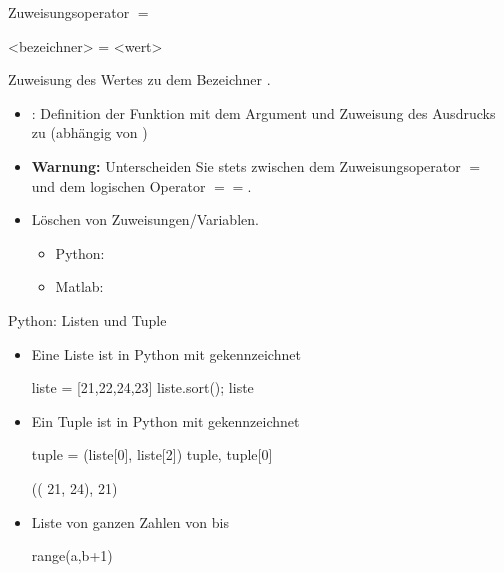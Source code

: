 \documentclass[hyperref={xetex}]{beamer}
\begin{document}
\begin{frame}[fragile]{Zuweisungsoperator $=$}
    \begin{pyin}
<bezeichner> = <wert>
    \end{pyin}   
Zuweisung des Wertes  zu dem Bezeichner .
\begin{itemize}
\item {\color{blue} }: Definition der Funktion  mit dem Argument  und Zuweisung des Ausdrucks  zu (abhängig von )
\item \textbf{Warnung:} Unterscheiden Sie  stets zwischen dem Zuweisungsoperator {\color{blue} $=$} und
dem logischen Operator {\color{blue} $==$}.   
\item Löschen von Zuweisungen/Variablen.
\begin{itemize}
\item Python: {\color{blue} }
\item Matlab: {\color{blue} }
\end{itemize}
\end{itemize}
\end{frame}

\begin{frame}[fragile]{Python: Listen und Tuple}
 \begin{itemize}
\item Eine \alert{Liste} ist in Python mit \isage{[..,..]} gekennzeichnet 
\begin{pyin}
liste = [21,22,24,23]
liste.sort(); liste 
\end{pyin}
\begin{pyout}
 [21, 22, 23, 24]
\end{pyout}
\item Ein \alert{Tuple} ist in Python mit  gekennzeichnet 
\begin{pyin}
tuple = (liste[0], liste[2])
tuple, tuple[0]
\end{pyin}
\begin{pyout}
(( 21, 24), 21) 
\end{pyout}
\item Liste von ganzen Zahlen von  bis 
\begin{pyin}
range(a,b+1)
\end{pyin}
 \end{itemize}
\end{frame}
\end{document}
